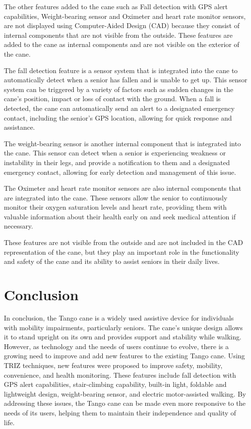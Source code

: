 \documentclass[12pt, twoside]{report}
\begin{document}
The other features added to the cane such as Fall detection with GPS alert capabilities, Weight-bearing sensor and Oximeter and heart rate monitor sensors, are not displayed using Computer-Aided Design (CAD) because they consist of internal components that are not visible from the outside. These features are added to the cane as internal components and are not visible on the exterior of the cane.

The fall detection feature is a sensor system that is integrated into the cane to automatically detect when a senior has fallen and is unable to get up. This sensor system can be triggered by a variety of factors such as sudden changes in the cane's position, impact or loss of contact with the ground. When a fall is detected, the cane can automatically send an alert to a designated emergency contact, including the senior's GPS location, allowing for quick response and assistance.

The weight-bearing sensor is another internal component that is integrated into the cane. This sensor can detect when a senior is experiencing weakness or instability in their legs, and provide a notification to them and a designated emergency contact, allowing for early detection and management of this issue.

The Oximeter and heart rate monitor sensors are also internal components that are integrated into the cane. These sensors allow the senior to continuously monitor their oxygen saturation levels and heart rate, providing them with valuable information about their health early on and seek medical attention if necessary.

These features are not visible from the outside and are not included in the CAD representation of the cane, but they play an important role in the functionality and safety of the cane and its ability to assist seniors in their daily lives.

\section{Conclusion}
In conclusion, the Tango cane is a widely used assistive device for individuals with mobility impairments, particularly seniors. The cane's unique design allows it to stand upright on its own and provides support and stability while walking. However, as technology and the needs of users continue to evolve, there is a growing need to improve and add new features to the existing Tango cane. Using TRIZ techniques, new features were proposed to improve safety, mobility, convenience, and health monitoring. These features include fall detection with GPS alert capabilities, stair-climbing capability, built-in light, foldable and lightweight design, weight-bearing sensor, and electric motor-assisted walking. By addressing these issues, the Tango cane can be made even more responsive to the needs of its users, helping them to maintain their independence and quality of life.
\end{document}
